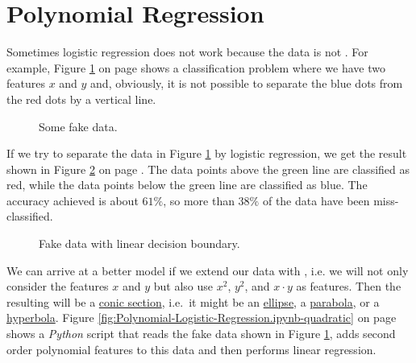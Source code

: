 \section{Polynomial Regression}
Sometimes logistic regression does not work because the data is not .  For example,
Figure \ref{fig:fake-data.pdf} on page \pageref{fig:fake-data.pdf} shows a classification problem where we have
two features $x$ and $y$ and, obviously, it is not possible to separate the blue dots from the red dots by a
vertical line.

\begin{figure}[!th]
\caption{Some fake data.}
\label{fig:fake-data.pdf}
\end{figure}

If we try to separate the data in Figure \ref{fig:fake-data.pdf} by logistic regression, we get the result
shown in Figure \ref{fig:fake-data-line.pdf} on page \pageref{fig:fake-data-line.pdf}.  The data points above
the green line are classified as red, while the data points below the green line are classified as blue.  The
accuracy achieved is about $61\%$, so more than $38\%$ of the data have been miss-classified.

\begin{figure}[!th]
\caption{Fake data with linear decision boundary.}
\label{fig:fake-data-line.pdf}
\end{figure}

We can arrive at a better model if we extend our data with , i.e. we will not only
consider the features $x$ and $y$ but also use $x^2$, $y^2$, and $x \cdot y$ as features.  Then the resulting
 will be a \href{https://en.wikipedia.org/wiki/Conic_section}{conic section}, i.e.~it
might be an \href{https://en.wikipedia.org/wiki/Ellipse}{ellipse}, a
\href{https://en.wikipedia.org/wiki/Parabola}{parabola}, or a
\href{https://en.wikipedia.org/wiki/Hyperbola}{hyperbola}. 
Figure \ref{fig:Polynomial-Logistic-Regression.ipynb-quadratic} on page
\pageref{fig:Polynomial-Logistic-Regression.ipynb-quadratic} shows a \textsl{Python} script that reads the fake
data shown in Figure \ref{fig:fake-data.pdf}, adds second order polynomial features to this data and then
performs linear regression.


